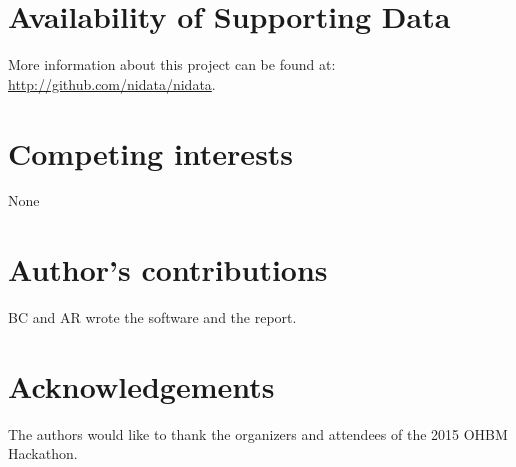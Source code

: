 \documentclass[twocolumn]{bmcart}%
\begin{document}
\begin{backmatter}

\section*{Availability of Supporting Data}
More information about this project can be found at: \url{http://github.com/nidata/nidata}.

\section*{Competing interests}
None

\section*{Author's contributions}
BC and AR wrote the software and the report.

\section*{Acknowledgements}
The authors would like to thank the organizers and attendees of the 2015
OHBM Hackathon.

  
  


\end{backmatter}
\end{document}
